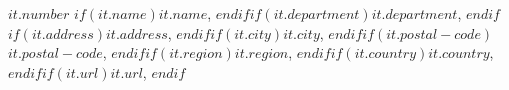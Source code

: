 $it.number$ $if(it.name)$$it.name$, $endif$$if(it.department)$$it.department$, $endif$$if(it.address)$$it.address$, $endif$$if(it.city)$$it.city$, $endif$$if(it.postal-code)$$it.postal-code$, $endif$$if(it.region)$$it.region$, $endif$$if(it.country)$$it.country$, $endif$$if(it.url)$$it.url$, $endif$
